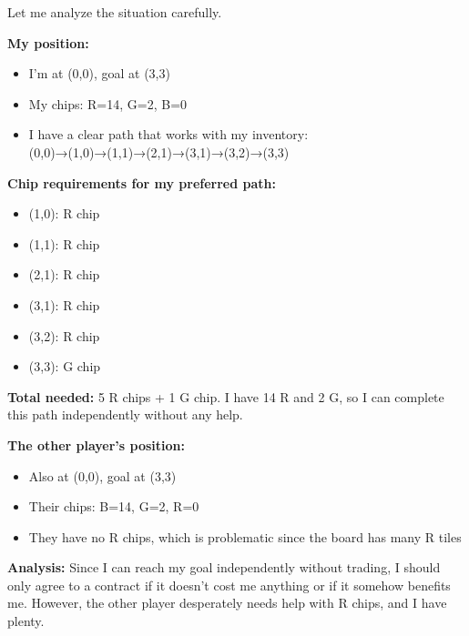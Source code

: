 \begin{redbox}[P-Red]
Let me analyze the situation carefully.

\vspace{0.5em}

\textbf{My position:}
\begin{itemize}
  \item I'm at (0,0), goal at (3,3)
  \item My chips: R=14, G=2, B=0
  \item I have a clear path that works with my inventory: (0,0)→(1,0)→(1,1)→(2,1)→(3,1)→(3,2)→(3,3)
\end{itemize}

\vspace{0.5em}

\textbf{Chip requirements for my preferred path:}
\begin{itemize}
  \item (1,0): R chip
  \item (1,1): R chip
  \item (2,1): R chip
  \item (3,1): R chip
  \item (3,2): R chip
  \item (3,3): G chip
\end{itemize}

\vspace{0.5em}

\textbf{Total needed:} 5 R chips + 1 G chip. I have 14 R and 2 G, so I can complete this path independently without any help.

\vspace{0.5em}

\textbf{The other player's position:}
\begin{itemize}
  \item Also at (0,0), goal at (3,3)
  \item Their chips: B=14, G=2, R=0
  \item They have no R chips, which is problematic since the board has many R tiles
\end{itemize}

\vspace{0.5em}

\textbf{Analysis:}
Since I can reach my goal independently without trading, I should only agree to a contract if it doesn't cost me anything or if it somehow benefits me. However, the other player desperately needs help with R chips, and I have plenty.

\vspace{0.5em}


\end{redbox}
